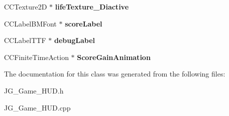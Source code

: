\begin{DoxyCompactItemize}
\item 
\hypertarget{class_j_g___game___h_u_d_a30f9f7a663ee085f9e7395baf2f84f1d}{C\-C\-Texture2\-D $\ast$ {\bfseries life\-Texture\-\_\-\-Diactive}}\label{class_j_g___game___h_u_d_a30f9f7a663ee085f9e7395baf2f84f1d}

\item 
\hypertarget{class_j_g___game___h_u_d_a6d0b18beb8a9c04c84edca7bbce1823b}{C\-C\-Label\-B\-M\-Font $\ast$ {\bfseries score\-Label}}\label{class_j_g___game___h_u_d_a6d0b18beb8a9c04c84edca7bbce1823b}

\item 
\hypertarget{class_j_g___game___h_u_d_a6491266bcee923289b843202babb03b4}{C\-C\-Label\-T\-T\-F $\ast$ {\bfseries debug\-Label}}\label{class_j_g___game___h_u_d_a6491266bcee923289b843202babb03b4}

\item 
\hypertarget{class_j_g___game___h_u_d_a4123d2201501fb112688f70a57382181}{C\-C\-Finite\-Time\-Action $\ast$ {\bfseries Score\-Gain\-Animation}}\label{class_j_g___game___h_u_d_a4123d2201501fb112688f70a57382181}

\end{DoxyCompactItemize}


The documentation for this class was generated from the following files\-:\begin{DoxyCompactItemize}
\item 
J\-G\-\_\-\-Game\-\_\-\-H\-U\-D.\-h\item 
J\-G\-\_\-\-Game\-\_\-\-H\-U\-D.\-cpp\end{DoxyCompactItemize}
